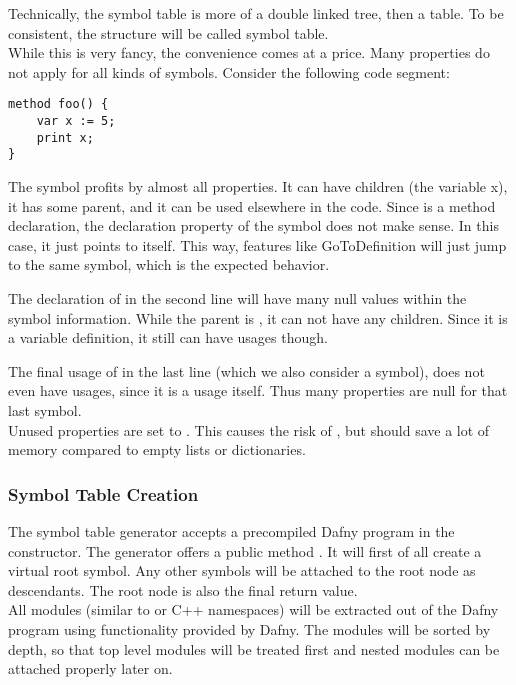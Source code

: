 Technically, the symbol table is more of a double linked tree, then a table.
To be consistent, the structure will be called symbol table.\\

While this is very fancy, the convenience comes at a price.
Many properties do not apply for all kinds of symbols.
Consider the following code segment:

\begin{lstlisting}[language=dafny, caption={Example Code Regarding Symbol Information}, captionpos=b, label={lst:aldbkajds}]
method foo() {
    var x := 5;
    print x;
}
\end{lstlisting}

The symbol  profits by almost all properties.
It can have children (the variable x), it has some parent, and it can be used elsewhere in the code.
Since  is a method declaration, the declaration property of the symbol does not make sense.
In this case, it just points to itself.
This way, features like GoToDefinition will just jump to the same symbol, which is the expected behavior.

The declaration of  in the second line will have many null values within the symbol information.
While the parent is , it can not have any children.
Since it is a variable definition, it still can have usages though.

The final usage of  in the last line (which we also consider a symbol), does not even have usages, since it is a usage itself.
Thus many properties are null for that last symbol.\\

Unused properties are set to .
This causes the risk of , but should save a lot of memory compared to empty lists or dictionaries.\\

\subsubsection{Symbol Table Creation}
The symbol table generator accepts a precompiled Dafny program in the constructor.
The generator offers a public method .
It will first of all create a virtual root symbol.
Any other symbols will be attached to the root node as descendants.
The root node is also the final return value.\\

All modules (similar to \CsharpWithSpace or C++ namespaces) will be extracted out of the Dafny program using functionality provided by Dafny.
The modules will be sorted by depth, so that top level modules will be treated first and nested modules can be attached properly later on.\\

